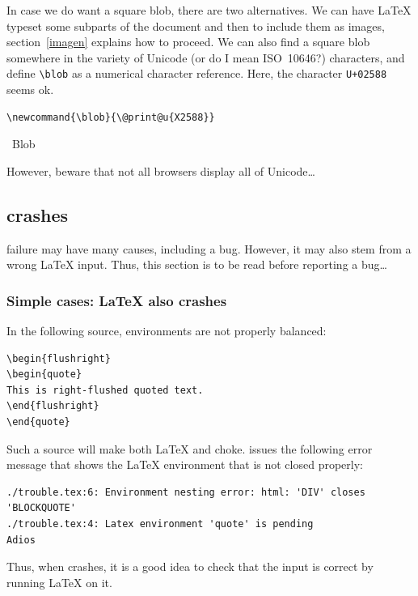 \label{square:blob}
%
In case we do want a square blob, there are two alternatives.
We can have \LaTeX{} typeset some subparts of
the document and then to include them as images, section~\ref{imagen}
explains how to proceed.
We can also find a square blob somewhere in the variety of Unicode
(or do I mean ISO~10646?) characters,
and define \verb+\blob+ as a numerical
character reference. Here, the character \texttt{U+02588}
seems ok.
\begin{verbatim}
\newcommand{\blob}{\@print@u{X2588}}
\end{verbatim}
\begin{htmlout}%
\begin{htmlonly}\newcommand{\blob}{}%
\blob\ Blob \blob
\end{htmlonly}
\begin{latexonly}\vspace*{.5ex}
%
\end{latexonly}%
\end{htmlout}
However, beware that not all browsers display all of Unicode\ldots


\subsection{\hevea{} crashes}

\hevea{} failure may have many causes, including a bug.
However, it may also stem from a wrong \LaTeX{} input.
Thus, this section is to be read before reporting a bug\ldots

\subsubsection{Simple cases: \LaTeX{} also crashes}
In  the following source, environments are not properly balanced:
\begin{verbatim}
\begin{flushright}
\begin{quote}
This is right-flushed quoted text.
\end{flushright}
\end{quote}
\end{verbatim}
Such a source will make both \LaTeX{} and \hevea{} choke.
\hevea{} issues the following error message that shows the \LaTeX{}
environment that is not closed properly:
\begin{verbatim}
./trouble.tex:6: Environment nesting error: html: 'DIV' closes 'BLOCKQUOTE'
./trouble.tex:4: Latex environment 'quote' is pending
Adios
\end{verbatim}
Thus, when \hevea{} crashes, it is a good idea to check that the
input is correct by running \LaTeX{} on it.

